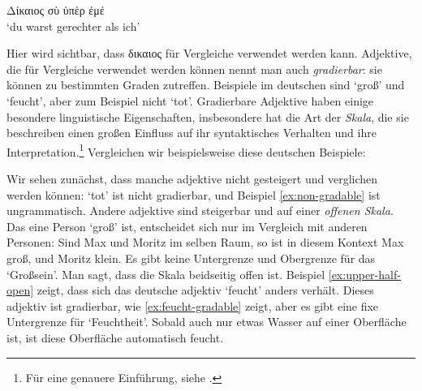 \begin{exe}
	\ex \label{ex:dikaios-gradable}
		{Δίκαιος σὺ ὑπὲρ ἐμέ \\
		 `du warst gerechter als ich'
		}
\end{exe}
Hier wird sichtbar, dass δικαιος für Vergleiche verwendet werden kann.
Adjektive, die für Vergleiche verwendet werden können nennt man auch \textit{gradierbar}: sie können zu bestimmten Graden zutreffen.
Beispiele im deutschen sind `groß' und `feucht', aber zum Beispiel nicht `tot'.
Gradierbare Adjektive haben einige besondere linguistische Eigenschaften, insbesondere hat die Art der \textit{Skala}, die sie beschreiben einen großen Einfluss auf ihr
syntaktisches Verhalten und ihre Interpretation.\footnote{
	Für eine genauere Einführung, siehe \Cite{scale-structure}.
}
Vergleichen wir beispielsweise diese deutschen Beispiele:
\begin{exe}
\ex\label{ex:open-closed} 
\begin{xlist}
\end{xlist}
\end{exe}
Wir sehen zunächst, dass manche adjektive nicht gesteigert und verglichen werden können: `tot' ist nicht gradierbar, und Beispiel \ref{ex:non-gradable} ist ungrammatisch.
Andere adjektive sind steigerbar und auf einer \textit{offenen Skala}. Das eine Person `groß' ist, entscheidet sich nur im Vergleich mit anderen Personen:
Sind Max und Moritz im selben Raum, so ist in diesem Kontext Max groß, und Moritz klein. Es gibt keine Untergrenze und Obergrenze für das `Großsein'.
Man sagt, dass die Skala beidseitig offen ist.
Beispiel \ref{ex:upper-half-open} zeigt, dass sich das deutsche adjektiv `feucht' anders verhält.
Dieses adjektiv ist gradierbar, wie \ref{ex:feucht-gradable} zeigt, aber es gibt eine fixe Untergrenze für `Feuchtheit'.
Sobald auch nur etwas Wasser auf einer Oberfläche ist, ist diese Oberfläche automatisch feucht.

\begin{exe}
\ex\label{ex:ambiguous-scale} 
\begin{xlist}
\end{xlist}
\end{exe}

